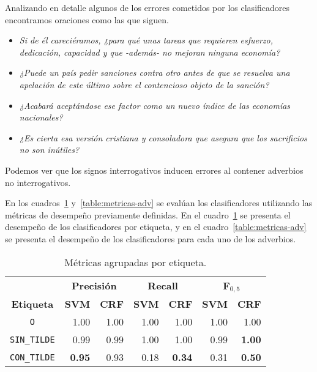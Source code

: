 \documentclass[runningheads,a4paper]{llncs}
\begin{document}
Analizando en detalle algunos de los errores cometidos por los clasificadores encontramos oraciones como las que siguen.
\begin{itemize}
\item{\emph{Si de él careciéramos, ¿para qué unas tareas que requieren esfuerzo, dedicación, capacidad y que -además- no mejoran ninguna economía?}}
\item{\emph{¿Puede un país pedir sanciones contra otro antes de que se resuelva una apelación de este último sobre el contencioso objeto de la sanción?}}
\item{\emph{¿Acabará aceptándose ese factor como un nuevo índice de las economías nacionales?}}
\item{\emph{¿Es cierta esa versión cristiana y consoladora que asegura que los sacrificios no son inútiles?}}
\end{itemize}
Podemos ver que los signos interrogativos inducen errores al contener adverbios no interrogativos.

En los cuadros~\ref{table:metricas-generales} y~\ref{table:metricas-adv} se evalúan los clasificadores utilizando las métricas de desempeño previamente definidas. En el cuadro~\ref{table:metricas-generales} se presenta el desempeño de los clasificadores por etiqueta, y en el cuadro~\ref{table:metricas-adv} se presenta el desempeño de los clasificadores para cada uno de los adverbios.

\begin{table}[ht]
 	\renewcommand{\arraystretch}{1.3}
	\renewcommand{\tabcolsep}{3pt}
	\caption{Métricas agrupadas por etiqueta.}
	\label{table:metricas-generales}
	\centering
	\begin{tabular}{c r r r r r r}
		\hline
		\multicolumn{1}{c}{} 
			& \multicolumn{2}{c}{\textbf{Precisión}} 
			& \multicolumn{2}{c}{\textbf{Recall}} 
			& \multicolumn{2}{c}{\textbf{F$_{0,5}$}} \\
		\multicolumn{1}{c}{\textbf{Etiqueta}} 
			& \multicolumn{1}{r}{\textbf{SVM}} & \multicolumn{1}{r}{\textbf{CRF}}
			& \multicolumn{1}{r}{\textbf{SVM}} & \multicolumn{1}{r}{\textbf{CRF}}
			& \multicolumn{1}{r}{\textbf{SVM}} & \multicolumn{1}{r}{\textbf{CRF}} \\
		\hline\hline
		\texttt{O} 		& 1.00 	& 1.00			& 1.00 & 1.00 			& 1.00 & 1.00 \\
		\texttt{SIN\_TILDE} 	& 0.99 & 0.99 			& 1.00 & 1.00 			& 0.99 & \textbf{1.00} \\
		\texttt{CON\_TILDE} 	& \textbf{0.95} & 0.93 	& 0.18 & \textbf{0.34} 	& 0.31 & \textbf{0.50} \\
		\hline
	\end{tabular}
\end{table}
\end{document}
